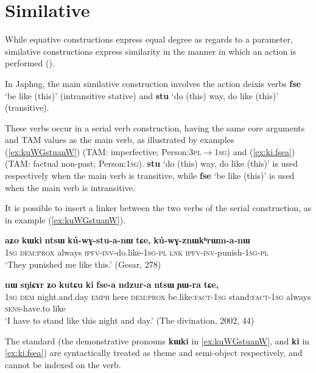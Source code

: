 \documentclass[oneside,a4paper,11pt]{article}
\newcommand{\ipa}[1]{{\phon\textbf{#1}}} %
\begin{document}
\section{Similative} \label{sec:similative}
While equative constructions express equal degree as regards to a parameter, similative constructions express similarity in the manner in which an action is performed (\citealt{haspelmath08equative}).

In Japhug, the main similative construction involves the action deixis verbs \ipa{fse} `be like (this)' (intransitive stative) and \ipa{stu} `do (this) way, do like (this)' (transitive).

These verbs occur in a serial verb construction, having the same core arguments and TAM values as the main verb, as illustrated by examples (\ref{ex:kuWGstuanW}) (TAM: imperfective; Person:\textsc{3pl$\rightarrow$1sg}) and (\ref{ex:ki.fsea}) (TAM: factual non-past; Person:\textsc{1sg}). \ipa{stu} `do (this) way, do like (this)' is used respectively when the main verb is transitive, while \ipa{fse} `be like (this)' is used when the main verb is intransitive.

It is possible to insert a linker between the two verbs of the serial construction, as in example (\ref{ex:kuWGstuanW}). 

\begin{exe}
\ex \label{ex:kuWGstuanW}
\gll 	
 \ipa{aʑo} 	\ipa{kɯki} 	\ipa{ntsɯ} 	\ipa{kú-wɣ-stu-a-nɯ} 	\ipa{tɕe,} 	\ipa{kú-wɣ-znɯkʰrɯm-a-nɯ} \\
 \textsc{1sg} \textsc{dem:prox} always \textsc{ipfv-inv}-do.like-\textsc{1sg-pl} \textsc{lnk} \textsc{ipfv-inv}-punish-\textsc{1sg-pl} \\
 \glt `They punished me like this.' (Gesar, 278)
\end{exe}	


\begin{exe}
\ex \label{ex:ki.fsea}
\gll \ipa{aʑo} 	\ipa{nɯ} 	\ipa{sŋiɕɤr} 	\ipa{ʑo} 	\ipa{kutɕu} 	\ipa{ki} 	\ipa{fse-a} 	\ipa{ndzur-a} 	\ipa{ntsɯ} 	\ipa{ɲɯ-ra} 	\ipa{tɕe,} \\
\textsc{1sg} \textsc{dem} night.and.day \textsc{emph} here \textsc{dem:prox} be.like:\textsc{fact-1sg} stand:\textsc{fact-1sg} always \textsc{sens}-have.to like \\
\glt `I have to stand like this night and day.' (The divination, 2002, 44)
\end{exe}

The standard (the demonstrative pronouns \ipa{kɯki} in \ref{ex:kuWGstuanW}, and \ipa{ki} in \ref{ex:ki.fsea}) are syntactically treated as theme and semi-object respectively, and cannot be indexed on the verb.
\end{document}
